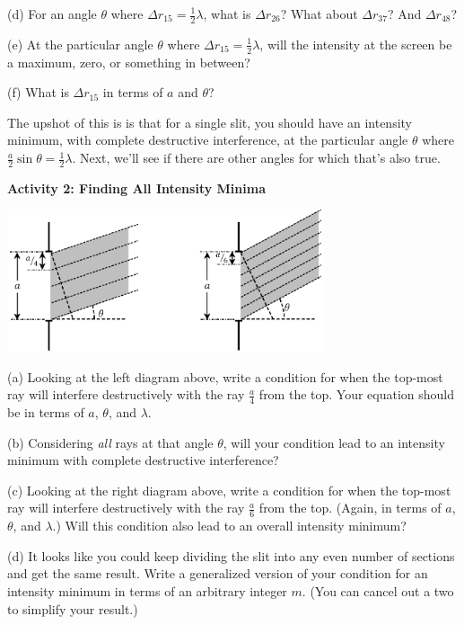 (d) For an angle $\theta$ where $\Delta r_{15}=\frac{1}{2}\lambda$, what is $\Delta r_{26}$?  What about $\Delta r_{37}$? And $\Delta r_{48}$?
\answerspace{0.5in}

(e) At the particular angle $\theta$ where $\Delta r_{15}=\frac{1}{2}\lambda$, will the intensity at the screen be a maximum, zero, or something in between?
\answerspace{0.4in}

(f) What is $\Delta r_{15}$ in terms of $a$ and $\theta$?
\answerspace{0.4in}

The upshot of this is is that for a single slit, you should have an intensity minimum, with complete destructive interference, at the particular angle $\theta$ where $\frac{a}{2} \sin \theta = \frac{1}{2}\lambda$.  Next, we'll see if there are other angles for which that's also true.

\pagebreak[3]
\textbf{Activity 2: Finding All Intensity Minima}

\vspace{-0.2in}
\begin{center}
\includegraphics[width=0.7\textwidth]{diffraction_of_light/fourths_and_sixths.eps}
\end{center}
\vspace{-0.2in}

(a) Looking at the left diagram above, write a condition for when the top-most ray will interfere destructively with the ray $\frac{a}{4}$ from the top.  Your equation should be in terms of $a$, $\theta$, and $\lambda$.  
\answerspace{0.4in}

(b) Considering \textit{all} rays at that angle $\theta$, will your condition lead to an intensity minimum with complete destructive interference?
\answerspace{0.4in}

(c) Looking at the right diagram above, write a condition for when the top-most ray will interfere destructively with the ray $\frac{a}{6}$ from the top.  (Again, in terms of $a$, $\theta$, and $\lambda$.)  Will this condition also lead to an overall intensity minimum?
\answerspace{0.4in}

(d) It looks like you could keep dividing the slit into any even number of sections and get the same result.  Write a generalized version of your condition for an intensity minimum in terms of an arbitrary integer $m$.  (You can cancel out a two to simplify your result.)

